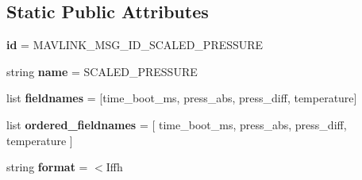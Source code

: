 \subsection*{Static Public Attributes}
\begin{DoxyCompactItemize}
\item 
\mbox{\label{classpymavlink_1_1dialects_1_1v10_1_1MAVLink__scaled__pressure__message_a9c60dd0cef40d876fc2cdb3174473c81}} 
{\bfseries id} = M\+A\+V\+L\+I\+N\+K\+\_\+\+M\+S\+G\+\_\+\+I\+D\+\_\+\+S\+C\+A\+L\+E\+D\+\_\+\+P\+R\+E\+S\+S\+U\+RE
\item 
\mbox{\label{classpymavlink_1_1dialects_1_1v10_1_1MAVLink__scaled__pressure__message_a42a20a7fbc0060dc0531f28c971658ff}} 
string {\bfseries name} = \textquotesingle{}S\+C\+A\+L\+E\+D\+\_\+\+P\+R\+E\+S\+S\+U\+RE\textquotesingle{}
\item 
\mbox{\label{classpymavlink_1_1dialects_1_1v10_1_1MAVLink__scaled__pressure__message_a52120a8a610d8fea5a7cb83bc234ef15}} 
list {\bfseries fieldnames} = \mbox{[}\textquotesingle{}time\+\_\+boot\+\_\+ms\textquotesingle{}, \textquotesingle{}press\+\_\+abs\textquotesingle{}, \textquotesingle{}press\+\_\+diff\textquotesingle{}, \textquotesingle{}temperature\textquotesingle{}\mbox{]}
\item 
\mbox{\label{classpymavlink_1_1dialects_1_1v10_1_1MAVLink__scaled__pressure__message_adfd1a4aac5794b99313d199030d53812}} 
list {\bfseries ordered\+\_\+fieldnames} = \mbox{[} \textquotesingle{}time\+\_\+boot\+\_\+ms\textquotesingle{}, \textquotesingle{}press\+\_\+abs\textquotesingle{}, \textquotesingle{}press\+\_\+diff\textquotesingle{}, \textquotesingle{}temperature\textquotesingle{} \mbox{]}
\item 
\mbox{\label{classpymavlink_1_1dialects_1_1v10_1_1MAVLink__scaled__pressure__message_a64c847b1a301854529d0b3c7cebb07f7}} 
string {\bfseries format} = \textquotesingle{}$<$Iffh\textquotesingle{}
\item 
\mbox{\label{classpymavlink_1_1dialects_1_1v10_1_1MAVLink__scaled__pressure__message_a8648bbdf4b44a37c42c678fe2a6e485a}} 

\end{DoxyCompactItemize}
